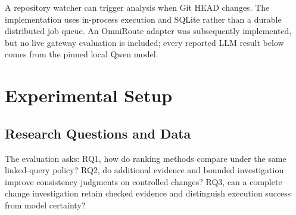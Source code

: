 \documentclass[conference,letterpaper,10pt]{IEEEtran}
\begin{document}
A repository watcher can trigger analysis when Git HEAD changes. The implementation uses in-process execution and SQLite rather than a durable distributed job queue. An OmniRoute adapter was subsequently implemented, but no live gateway evaluation is included; every reported LLM result below comes from the pinned local Qwen model.

\section{Experimental Setup}
\subsection{Research Questions and Data}
The evaluation asks: RQ1, how do ranking methods compare under the same linked-query policy? RQ2, do additional evidence and bounded investigation improve consistency judgments on controlled changes? RQ3, can a complete change investigation retain checked evidence and distinguish execution success from model certainty?
\end{document}
